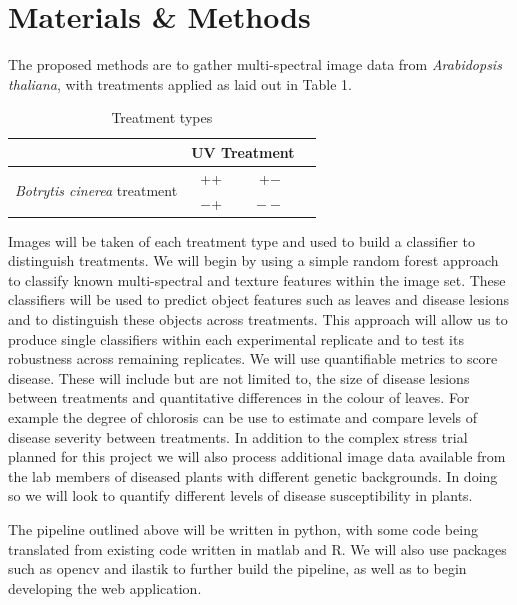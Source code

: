 \documentclass[a4paper]{article}
\begin{document}
    
    
	\section{Materials \& Methods}   
	
	The proposed methods are to gather multi-spectral image data from \textit{Arabidopsis thaliana}, with treatments applied as laid out in
	Table 1.
    
    
  \begin{table}
  \caption{Treatment types}
  \centering
  \begin{tabular}{|c|c|c|c|}
  \hline
  \hline \cline{2-4}
    & \multicolumn{2}{|c|}{UV Treatment}\\
    \hline
    \multirow{2}{4em}{\textit{Botrytis cinerea} treatment} & ++ & +$-$\\
    & $-$+ & $--$\\
    \hline
  \end{tabular}
  \end{table}

	Images will be taken of each treatment type and used to build a classifier to distinguish treatments.
	We will begin by using a simple random forest approach to classify known multi-spectral and texture features within
	the image set. These classifiers will be used to predict object features such as leaves and disease lesions and to
	distinguish these objects across treatments. This approach will allow us to produce single classifiers within each
	experimental replicate and to test its robustness across remaining replicates. We will use quantifiable metrics to
	score disease. These will include but are not limited to, the size of disease lesions between treatments and
	quantitative differences in the colour of leaves. For example the degree of chlorosis can be use to estimate and
	compare levels of disease severity between treatments. In addition to the complex stress trial planned for this
	project we will also process additional image data available from the lab members of diseased plants with different
	genetic backgrounds. In doing so we will look to quantify different levels of disease susceptibility in plants. 
	
	The pipeline outlined above will be written in python, with some code being translated from existing code 
    written in matlab and R. We will also use packages such as opencv and ilastik to further build the pipeline, as well
    as to begin developing the web application.
    
\end{document}
